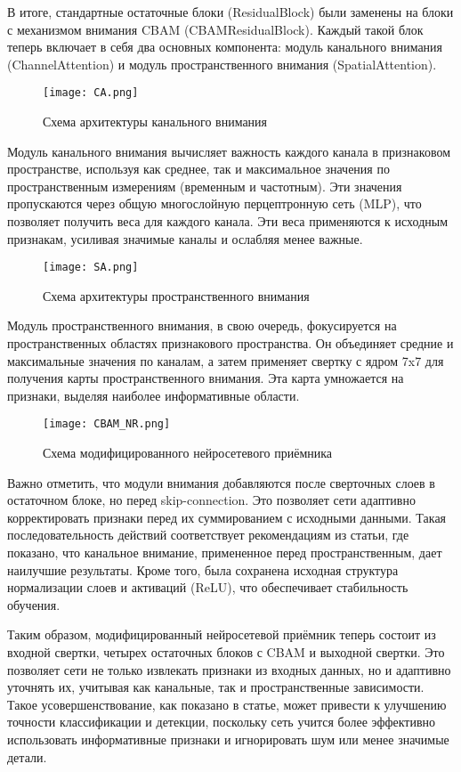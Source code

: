 \documentclass{article}
\begin{document}
В итоге, стандартные остаточные блоки (ResidualBlock) были заменены на блоки с механизмом внимания CBAM (CBAMResidualBlock). Каждый такой блок теперь включает в себя два основных компонента: модуль канального внимания (ChannelAttention) и модуль пространственного внимания (SpatialAttention).


\begin{figure}[H]
    \centering \texttt{[image: CA.png]}
    \caption{Схема архитектуры канального внимания} 
\end{figure}

Модуль канального внимания вычисляет важность каждого канала в признаковом пространстве, используя как среднее, так и максимальное значения по пространственным измерениям (временным и частотным). Эти значения пропускаются через общую многослойную перцептронную сеть (MLP), что позволяет получить веса для каждого канала. Эти веса применяются к исходным признакам, усиливая значимые каналы и ослабляя менее важные. 

\begin{figure}[H]
    \centering \texttt{[image: SA.png]}
    \caption{Схема архитектуры пространственного внимания} 
\end{figure}

Модуль пространственного внимания, в свою очередь, фокусируется на пространственных областях признакового пространства. Он объединяет средние и максимальные значения по каналам, а затем применяет свертку с ядром 7x7 для получения карты пространственного внимания. Эта карта умножается на признаки, выделяя наиболее информативные области.

\begin{figure}[H]
    \centering \texttt{[image: CBAM\_NR.png]}
    \caption{Схема модифицированного нейросетевого приёмника} 
\end{figure}


Важно отметить, что модули внимания добавляются после сверточных слоев в остаточном блоке, но перед skip-connection. Это позволяет сети адаптивно корректировать признаки перед их суммированием с исходными данными. Такая последовательность действий соответствует рекомендациям из статьи, где показано, что канальное внимание, примененное перед пространственным, дает наилучшие результаты. Кроме того, была сохранена исходная структура нормализации слоев и активаций (ReLU), что обеспечивает стабильность обучения.

Таким образом, модифицированный нейросетевой приёмник теперь состоит из входной свертки, четырех остаточных блоков с CBAM и выходной свертки. Это позволяет сети не только извлекать признаки из входных данных, но и адаптивно уточнять их, учитывая как канальные, так и пространственные зависимости. Такое усовершенствование, как показано в статье, может привести к улучшению точности классификации и детекции, поскольку сеть учится более эффективно использовать информативные признаки и игнорировать шум или менее значимые детали. 
\end{document}
